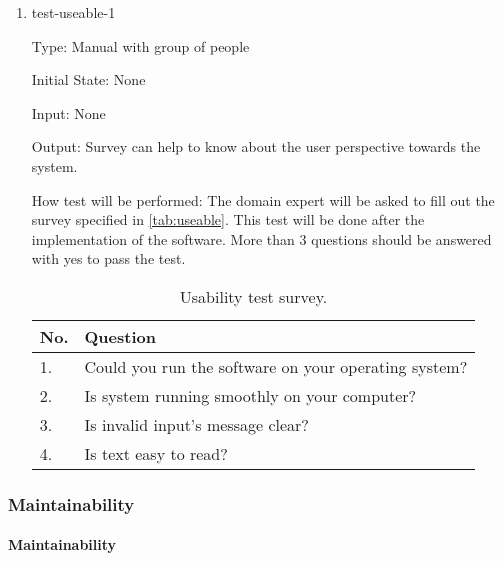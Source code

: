 \documentclass[12pt, titlepage]{article}
\begin{document}
\begin{enumerate}

  \item{test-useable-1\\}

        Type: Manual with group of people

        Initial State: None

        Input: None

        Output: Survey can help to know about the user perspective towards the system.

        How test will be performed: The domain expert will be asked to fill out the survey
        specified in \autoref{tab:useable}. This test will be done after the implementation
        of the software. More than 3 questions should be answered with yes to pass the test.

        \begin{table}[!h]
          \centering
          \caption{Usability test survey.}
          \label{tab:useable}
          \begin{tabular}{ p{0.5cm}|p{10cm} }
            \hline
            No. & Question                                             \\
            \hline
            1.  & Could you run the software on your operating system? \\
            2.  & Is system running smoothly on your computer?         \\
            3.  & Is invalid input's message clear?                    \\
            4.  & Is text easy to read?                                \\
            \hline
          \end{tabular}
        \end{table}

\end{enumerate}

\subsubsection{Maintainability}

\paragraph{Maintainability}
\end{document}
